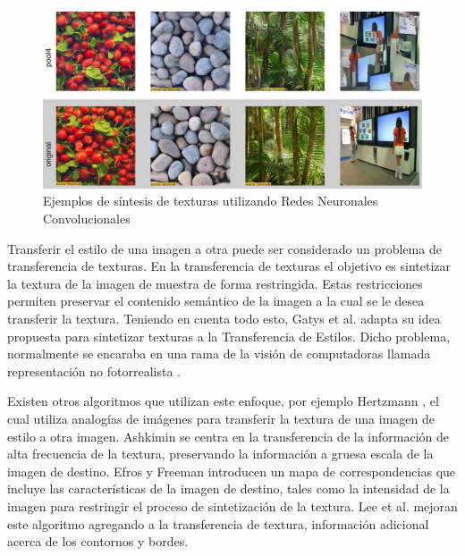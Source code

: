 \documentclass[a4paper,11pt,spanish]{book}
\begin{document}
      \begin{figure}[H]
	\begin{center}
	  \includegraphics[width=0.8\linewidth]{./img/textures.png}
	\end{center}
	\caption{Ejemplos de síntesis de texturas utilizando Redes Neuronales Convolucionales}
	\label{fig:textures}
      \end{figure}      
      
      Transferir el estilo de una imagen a otra puede ser considerado un problema de transferencia de texturas. 
      En la transferencia de texturas el objetivo es sintetizar la textura de la imagen de muestra de forma restringida.
      Estas restricciones permiten preservar el contenido semántico de la imagen a la cual se le desea transferir la textura.
      Teniendo en cuenta todo esto, Gatys et al. adapta su idea propuesta para sintetizar texturas a la Transferencia de Estilos.
      Dicho problema, normalmente se encaraba en una rama de la visión de computadoras llamada representación no fotorrealista \cite{Kyprianidis:ArtisticStylization}.
      
      Existen otros algoritmos que utilizan este enfoque, por ejemplo 
      Hertzmann \cite{Hertzmann:ImageAnalogies}, el cual utiliza analogías de imágenes para transferir la textura de una imagen de estilo a otra imagen. 
      Ashkimin \cite{Ashikhmin:FastTextureTransfer} se centra en la transferencia de la información de alta frecuencia de la textura, preservando la información a gruesa escala de 
      la imagen de destino. 
      Efros y Freeman \cite{Efros:ImageQuilting} introducen un mapa de correspondencias que incluye las características de la imagen de destino, tales como la intensidad 
      de la imagen para restringir el proceso de sintetización de la textura.
      Lee et al. \cite{Lee:DirectionalTextureTransfer} mejoran este algoritmo agregando a la transferencia de textura, información adicional acerca de los contornos y bordes.
      
\end{document}
